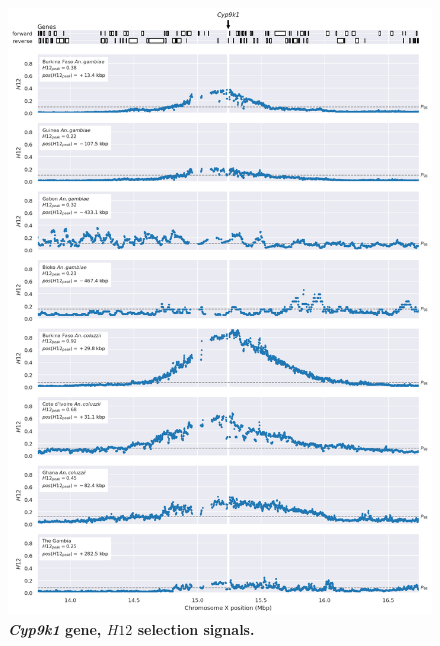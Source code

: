 \documentclass[a4paper,11pt,abstracton,hidelinks]{scrartcl}
\begin{document}
\clearpage


\begin{figure}[t!]
	\begin{center}
		\includegraphics*[width=1\linewidth,center]{artwork/locus_cyp9k1_h12_pdist.png}
	\end{center}
	\caption[\textit{Cyp9k1} gene, $H12$ selection signals]{
	\textbf{\textit{Cyp9k1} gene, $H12$ selection signals.}
	} 
	\label{fig:locus_cyp9k1_h12}
\end{figure}


\clearpage
\end{document}
